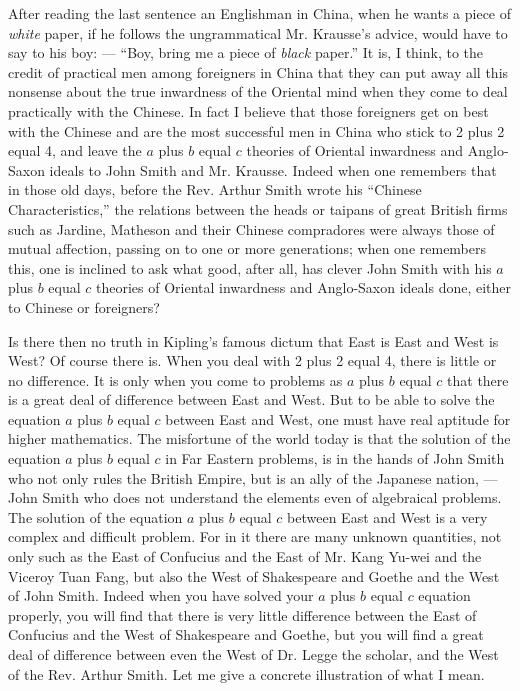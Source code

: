 After reading the last sentence an Englishman in China, when he wants a piece of \emph{white} paper, if he follows the ungrammatical Mr. Krausse's advice, would have to say to his boy: --- ``Boy, bring me a piece of \emph{black} paper.''
It is, I think, to the credit of practical men among foreigners in China that they can put away all this nonsense about the true inwardness of the Oriental mind when they come to deal practically with the Chinese.
In fact I believe that those foreigners get on best with the Chinese and are the most successful men in China who stick to 2 plus 2 equal 4, and leave the $a$ plus $b$ equal $c$ theories of Oriental inwardness and Anglo-Saxon ideals to John Smith and Mr. Krausse.
Indeed when one remembers that in those old days, before the Rev. Arthur Smith wrote his ``Chinese Characteristics,'' the relations between the heads or taipans of great British firms such as Jardine, Matheson and their Chinese compradores were always those of mutual affection, passing on to one or more generations;
when one remembers this, one is inclined to ask what good, after all, has clever John Smith with his $a$ plus $b$ equal $c$ theories of Oriental inwardness and Anglo-Saxon ideals done, either to Chinese or foreigners?

Is there then no truth in Kipling's famous dictum that East is East and West is West?
Of course there is.
When you deal with 2 plus 2 equal 4, there is little or no difference.
It is only when you come to problems as $a$ plus $b$ equal $c$ that there is a great deal of difference between East and West.
But to be able to solve the equation $a$ plus $b$ equal $c$ between East and West, one must have real aptitude for higher mathematics.
The misfortune of the world today is that the solution of the equation $a$ plus $b$ equal $c$ in Far Eastern problems, is in the hands of John Smith who not only rules the British Empire, but is an ally of the Japanese nation, --- John Smith who does not understand the elements even of algebraical problems.
The solution of the equation $a$ plus $b$ equal $c$ between East and West is a very complex and difficult problem.
For in it there are many unknown quantities, not only such as the East of Confucius and the East of Mr. Kang Yu-wei and the Viceroy Tuan Fang, but also the West of Shakespeare and Goethe and the West of John Smith.
Indeed when you have solved your $a$ plus $b$ equal $c$ equation properly, you will find that there is very little difference between the East of Confucius and the West of Shakespeare and Goethe, but you will find a great deal of difference between even the West of Dr. Legge the scholar, and the West of the Rev. Arthur Smith.
Let me give a concrete illustration of what I mean.

